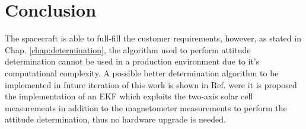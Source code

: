 \documentclass[11pt,a4paper]{report}
\begin{document}
\chapter{Conclusion}   
The spacecraft is able to full-fill the customer requirements, however, as stated in Chap. \ref{chap:determination}, the algorithm used to perform attitude determination cannot be used in a production environment due to it's computational complexity.
A possible better determination algorithm to be implemented in future iteration of this work is shown in Ref. \cite{Ref:Articles:Pela} were it is proposed the implementation of an EKF which exploits the two-axis solar cell measurements in addition to the magnetometer measurements to perform the attitude determination, thus no hardware upgrade is needed.
\newpage
\end{document}
